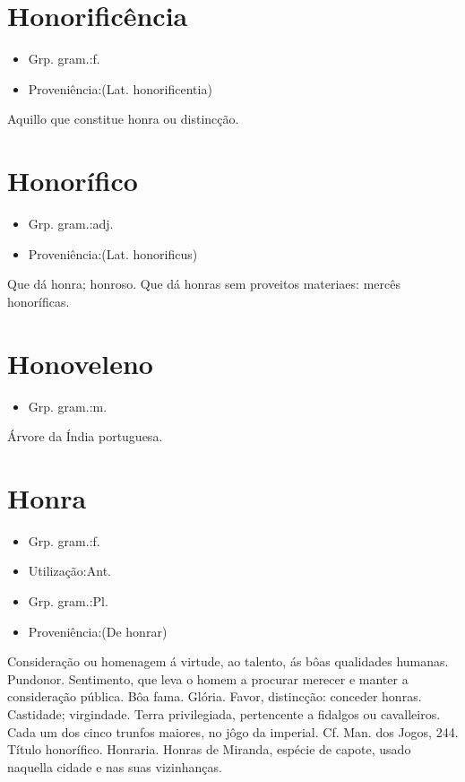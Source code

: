 \documentclass{article}
\begin{document}
\section{Honorificência}
\begin{itemize}
\item {Grp. gram.:f.}
\end{itemize}
\begin{itemize}
\item {Proveniência:(Lat. \textunderscore honorificentia\textunderscore )}
\end{itemize}
Aquillo que constitue honra ou distincção.
\section{Honorífico}
\begin{itemize}
\item {Grp. gram.:adj.}
\end{itemize}
\begin{itemize}
\item {Proveniência:(Lat. \textunderscore honorificus\textunderscore )}
\end{itemize}
Que dá honra; honroso.
Que dá honras sem proveitos materiaes: \textunderscore mercês honoríficas\textunderscore .
\section{Honoveleno}
\begin{itemize}
\item {Grp. gram.:m.}
\end{itemize}
Árvore da Índia portuguesa.
\section{Honra}
\begin{itemize}
\item {Grp. gram.:f.}
\end{itemize}
\begin{itemize}
\item {Utilização:Ant.}
\end{itemize}
\begin{itemize}
\item {Grp. gram.:Pl.}
\end{itemize}
\begin{itemize}
\item {Proveniência:(De \textunderscore honrar\textunderscore )}
\end{itemize}
Consideração ou homenagem á virtude, ao talento, ás bôas qualidades humanas.
Pundonor.
Sentimento, que leva o homem a procurar merecer e manter a consideração pública.
Bôa fama.
Glória.
Favor, distincção: \textunderscore conceder honras\textunderscore .
Castidade; virgindade.
Terra privilegiada, pertencente a fidalgos ou cavalleiros.
Cada um dos cinco trunfos maiores, no jôgo da imperial. Cf. \textunderscore Man. dos Jogos\textunderscore , 244.
Título honorífico.
Honraria.
\textunderscore Honras de Miranda\textunderscore , espécie de capote, usado naquella cidade e nas suas vizinhanças.
\end{document}
